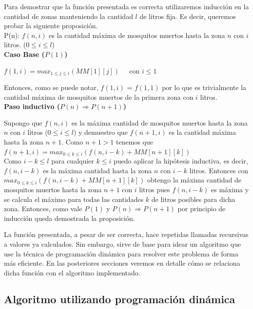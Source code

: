 \documentclass[a4paper,11pt] {article}
\begin{document}
Para demostrar que la funci\'on presentada es correcta utilizaremos inducci\'on en la cantidad de zonas manteniendo la cantidad $l$ de litros fija. Es decir, queremos probar la siguiente proposici\'on. \\

P(n): $f(n, i)$ es la cantidad m\'axima de mosquitos muertos hasta la zona $n$ con $i$ litros. ($0 \leq i \leq l$) \\

\textbf{Caso Base ($P(1)$)}

$f(1,i) = max_{1 \leq j \leq i} (MM[1][j]) \;\;\;\; $ con $i \leq 1$

Entonces, como se puede notar, $f(1,i)$ = $f (1,1)$ por lo que es trivialmente la cantidad m\'axima de mosquitos muertos de la primera zona con $i$ litros. \\

\textbf{Paso inductivo ($P(n) \Rightarrow P(n+1)$)}

Supongo que $f(n,i)$ es la m\'axima cantidad de mosquitos muertos hasta la zona $n$ con $i$ litros ($0 \leq i \leq l$) y demuestro que $f(n+1,i)$ es la cantidad m\'axima hasta la zona $n+1$.
Como $n+1 > 1$ tenemos que \\

$f(n+1,i) = max_{0 \leq k \leq i} (f(n, i-k) + MM[n+1][k])$ \\

Como $i - k \leq l$ para cualquier $k \leq i$ puedo aplicar la hip\'otesis inductiva, es decir, $f(n,i-k)$ es la m\'axima cantidad hasta la zona $n$ con $i-k$ litros. Entonces con $max_{0 \leq k \leq i} (f(n, i-k) + MM[n+1][k])$ obtengo la m\'axima cantidad de mosquitos muertos hasta la zona $n+1$ con $i$ litros pues $f(n,i-k)$ es m\'axima y se calcula el m\'aximo para todas las cantidades $k$ de litros posibles para dicha zona. Entonces, como vale $P(1)$ y $P(n) \Rightarrow P(n+1)$ por principio de inducci\'on queda demostrada la proposici\'on.

La funci\'on presentada, a pesar de ser correcta, hace repetidas llamadas recursivas a valores ya calculados. Sin embargo, sirve de base para idear un algoritmo que use la t\'ecnica de programaci\'on din\'amica para resolver este problema de forma m\'as eficiente. En las posteriores secciones veremos en detalle c\'omo se relaciona dicha funci\'on con el algoritmo implementado.

\subsection*{Algoritmo utilizando programaci\'on din\'amica}
\end{document}
